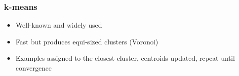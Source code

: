 \documentclass{beamer}
\begin{document}
\begin{frame}
\frametitle{k-means}
    \begin{itemize}
    \item Well-known and widely used
    \item Fast but produces equi-sized clusters (Voronoi)
    \item Examples assigned to the closest cluster, centroids updated, repeat until convergence
    \end{itemize}
\end{frame}






\end{document}
